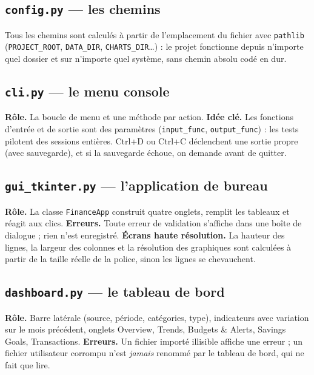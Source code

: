 \documentclass[11pt,a4paper]{article}
\newcommand{\code}[1]{{\NoAutoSpacing\texttt{#1}}}
\begin{document}
\subsection{\code{config.py} --- les chemins}
Tous les chemins sont calculés à partir de l'emplacement du fichier avec \code{pathlib}
(\code{PROJECT\_ROOT}, \code{DATA\_DIR}, \code{CHARTS\_DIR}\dots) : le projet fonctionne
depuis n'importe quel dossier et sur n'importe quel système, sans chemin absolu codé en dur.

\subsection{\code{cli.py} --- le menu console}
\textbf{Rôle.} La boucle de menu et une méthode par action. \textbf{Idée clé.} Les fonctions
d'entrée et de sortie sont des paramètres (\code{input\_func}, \code{output\_func}) : les tests
pilotent des sessions entières. Ctrl+D ou Ctrl+C déclenchent une sortie propre (avec
sauvegarde), et si la sauvegarde échoue, on demande avant de quitter.


\subsection{\code{gui\_tkinter.py} --- l'application de bureau}
\textbf{Rôle.} La classe \code{FinanceApp} construit quatre onglets, remplit les tableaux et
réagit aux clics. \textbf{Erreurs.} Toute erreur de validation s'affiche dans une boîte de
dialogue ; rien n'est enregistré. \textbf{Écrans haute résolution.} La hauteur des lignes, la
largeur des colonnes et la résolution des graphiques sont calculées à partir de la taille
réelle de la police, sinon les lignes se chevauchent.

\subsection{\code{dashboard.py} --- le tableau de bord}
\textbf{Rôle.} Barre latérale (source, période, catégories, type), indicateurs avec variation
sur le mois précédent, onglets Overview, Trends, Budgets \& Alerts, Savings Goals,
Transactions. \textbf{Erreurs.} Un fichier importé illisible affiche une erreur ; un fichier
utilisateur corrompu n'est \emph{jamais} renommé par le tableau de bord, qui ne fait que lire.

\end{document}
